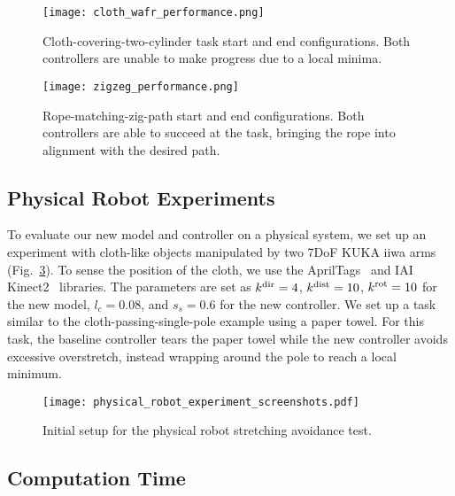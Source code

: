 \begin{figure}[t]
    \centering
    \texttt{[image: cloth\_wafr\_performance.png]}
    \caption{Cloth-covering-two-cylinder task start and end configurations. Both controllers are unable to make progress due to a local minima.}
    \label{fig:cloth_wafr_performance}
\end{figure}


\begin{figure}[t]
    \centering
    \texttt{[image: zigzeg\_performance.png]}
    \caption{Rope-matching-zig-path start and end configurations. Both controllers are able to succeed at the task, bringing the rope into alignment with the desired path.}
    \label{fig:zigzeg_performance}
\end{figure}



\subsection{Physical Robot Experiments}

To evaluate our new model and controller on a physical system, we set up an experiment with cloth-like objects manipulated by two 7DoF KUKA iiwa arms (Fig.~\ref{fig:physical_experiment_screenshots_ctl}). To sense the position of the cloth, we use the AprilTags~\cite{olson2011tags} and IAI Kinect2~\cite{iai_kinect2} libraries. The parameters are set as $k^\textrm{dir} = 4$, $k^\textrm{dist} = 10$, $k^{\textrm{rot}} = 10$ for the new model, $l_c = 0.08$, and $s_s = 0.6$ for the new controller. We set up a task similar to the cloth-passing-single-pole example using a paper towel. For this task, the baseline controller tears the paper towel while the new controller avoids excessive overstretch, instead wrapping around the pole to reach a local minimum.

\begin{figure}[t]
    \centering
    \texttt{[image: physical\_robot\_experiment\_screenshots.pdf]}
    \caption{Initial setup for the physical robot stretching avoidance test.}
    \label{fig:physical_experiment_screenshots_ctl}
\end{figure}


\subsection{Computation Time}

